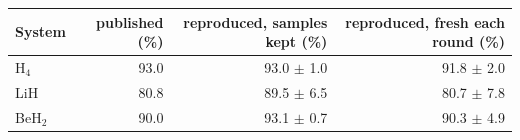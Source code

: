 \begin{tabular}{@{}lrrr@{}}
\toprule
System & published (\%) & reproduced, samples kept (\%) & reproduced, fresh each round (\%) \\
\midrule
H$_4$ & 93.0 & 93.0 $\pm$ 1.0 & 91.8 $\pm$ 2.0 \\
LiH & 80.8 & 89.5 $\pm$ 6.5 & 80.7 $\pm$ 7.8 \\
BeH$_2$ & 90.0 & 93.1 $\pm$ 0.7 & 90.3 $\pm$ 4.9 \\
\bottomrule
\end{tabular}

